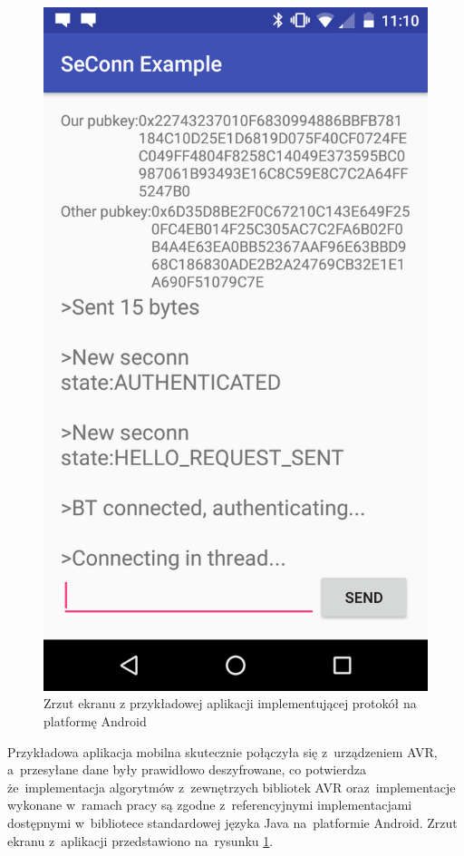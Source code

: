 \begin{figure}
\centering
\includegraphics[height=0.6\textheight]{images/android.png}
\caption{Zrzut ekranu z przykładowej aplikacji implementującej protokół na platformę Android}
\label{fig:android}
\end{figure}

Przykładowa aplikacja mobilna skutecznie połączyła się z~urządzeniem AVR, a~przesyłane dane były prawidłowo deszyfrowane, co potwierdza że~implementacja algorytmów z~zewnętrzych bibliotek AVR oraz~implementacje wykonane w~ramach pracy są zgodne z~referencyjnymi implementacjami dostępnymi w~bibliotece standardowej języka Java na~platformie Android. Zrzut ekranu z~aplikacji przedstawiono na~rysunku \ref{fig:android}.

